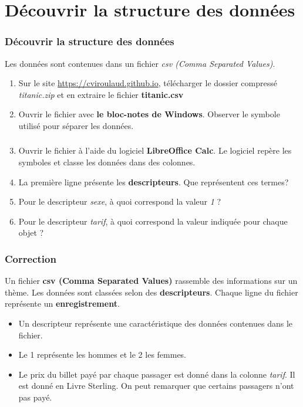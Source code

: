 \documentclass[svgnames,11pt]{beamer}
\begin{document}
\section{Découvrir la structure des données}
\begin{frame}
    \frametitle{Découvrir la structure des données}
    Les données sont contenues dans un fichier \emph{csv (Comma Separated Values)}.
    \begin{activite}
        \begin{enumerate}
            \item Sur le site \url{https://cviroulaud.github.io}, télécharger le dossier compressé \emph{titanic.zip} et en extraire le fichier \textbf{titanic.csv}
            \item Ouvrir le fichier avec \textbf{le bloc-notes de Windows}. Observer le symbole utilisé pour séparer les données.
        \end{enumerate}
    \end{activite}

\end{frame}
\begin{frame}
    \frametitle{}
    \setcounter{compteuractivite}{0}
    \begin{activite}
        \begin{enumerate}
            \setcounter{enumi}{2}
            \item Ouvrir le fichier à l'aide du logiciel \textbf{LibreOffice Calc}. Le logiciel repère les symboles et classe les données dans des colonnes.
            \item La première ligne présente les \textbf{descripteurs}. Que représentent ces termes?
            \item Pour le descripteur \emph{sexe}, à quoi correspond la valeur \emph{1} ?
            \item Pour le descripteur \emph{tarif}, à quoi correspond la valeur indiquée pour chaque objet ?
        \end{enumerate}
    \end{activite}

\end{frame}
\begin{frame}
    \frametitle{Correction}
\begin{aretenir}[]
Un fichier \textbf{csv (Comma Separated Values)} rassemble des informations sur un thème. Les données sont classées selon des \textbf{descripteurs}. Chaque ligne du fichier représente un \textbf{enregistrement}.
\end{aretenir}
    \begin{itemize}
        \item Un descripteur représente une caractéristique des données contenues dans le fichier.
        \item Le 1 représente les hommes et le 2 les femmes.
        \item Le prix du billet payé par chaque passager est donné dans la colonne \emph{tarif}. Il est donné en Livre Sterling. On peut remarquer que certains passagers n'ont pas payé.
    \end{itemize}

\end{frame}
\end{document}
